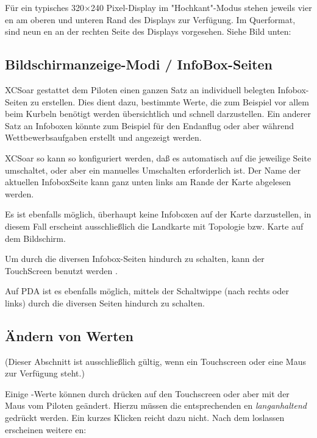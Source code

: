 Für ein typisches 320$\times$240 Pixel-Display im "Hochkant"-Modus stehen jeweils vier {\InfoBox}en am oberen und unteren Rand des Displays zur Verfügung. 
Im Querformat, sind neun {\InfoBox}en an der rechten Seite des Displays vorgesehen. Siehe Bild unten:


\subsection*{Bildschirmanzeige-Modi / InfoBox-Seiten}

\textsf{XCSoar} gestattet dem Piloten einen ganzen Satz an individuell belegten Infobox-Seiten zu erstellen.
Dies dient dazu, bestimmte Werte, die zum Beispiel vor allem beim Kurbeln  benötigt werden übersichtlich und schnell darzustellen.
Ein anderer Satz an Infoboxen könnte zum Beispiel für den Endanflug oder aber während Wettbewerbsaufgaben erstellt und angezeigt werden.

\textsf{XCSoar} so kann so konfiguriert werden, daß es automatisch auf die jeweilige Seite umschaltet, oder aber ein manuelles Umschalten erforderlich ist. Der Name der aktuellen InfoboxSeite kann ganz unten links am Rande der Karte abgelesen werden.

Es ist ebenfalls möglich, überhaupt keine Infoboxen auf der Karte darzustellen, in diesem Fall erscheint ausschließlich die Landkarte mit Topologie bzw. Karte auf dem Bildschirm.

Um durch die diversen Infobox-Seiten hindurch zu schalten, kann der TouchScreen benutzt werden
. 

Auf PDA ist es ebenfalls möglich,  mittels der Schaltwippe  (nach rechts oder links) durch die diversen Seiten hindurch zu schalten.

\subsection*{Ändern von  {\InfoBox} Werten}
(Dieser Abschnitt ist ausschließlich gültig, wenn ein Touchscreen oder eine Maus zur Verfügung steht.)

Einige {\InfoBox}-Werte können durch drücken auf den Touchscreen oder aber mit der Maus vom Piloten geändert.
Hierzu müssen die entsprechenden {\InfoBox}en  \emph{langanhaltend} gedrückt werden.
Ein kurzes Klicken reicht dazu nicht.  Nach dem loslassen erscheinen weitere {\InfoBox}en:

